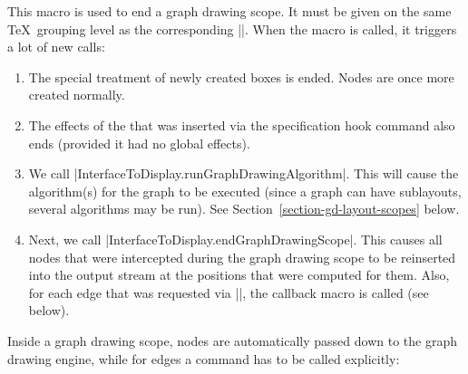 \begin{command}{\pgfgdendscope}
    This macro is used to end a graph drawing scope. It must be given on the
    same \TeX\ grouping level as the corresponding |\pgfgdbeginscope|. When the
    macro is called, it triggers a lot of new calls:
    \begin{enumerate}
        \item The special treatment of newly created boxes is ended. Nodes are
            once more created normally.
        \item The effects of the  that was inserted via the
            specification hook command also ends (provided it had no global
            effects).
        \item We call |InterfaceToDisplay.runGraphDrawingAlgorithm|. This will
            cause the algorithm(s) for the graph to be executed (since a graph
            can have sublayouts, several algorithms may be run). See
            Section~\ref{section-gd-layout-scopes} below.
        \item Next, we call |InterfaceToDisplay.endGraphDrawingScope|. This
            causes all nodes that were intercepted during the graph drawing
            scope to be reinserted into the output stream at the positions that
            were computed for them. Also, for each edge that was requested via
            |\pgfgdedge|, the callback macro is called (see below).
    \end{enumerate}
\end{command}

Inside a graph drawing scope, nodes are automatically passed down to the graph
drawing engine, while for edges a command has to be called explicitly:

